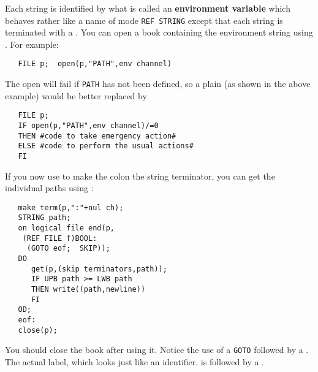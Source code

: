 Each string is identified by what is called an
\textbf{environment variable} which behaves rather like a name of
mode \verb|REF STRING|
except that each string is terminated with a .
You can open a book containing the environment string using
. For example:
\begin{verbatim}
   FILE p;  open(p,"PATH",env channel)
\end{verbatim}
\noindent
The open will fail if \verb|PATH| has not been defined, so
a plain  (as shown in the above example)
would be better replaced by
\begin{verbatim}
   FILE p;
   IF open(p,"PATH",env channel)/=0
   THEN #code to take emergency action#
   ELSE #code to perform the usual actions#
   FI
\end{verbatim}
\noindent
If you now use  to make the
colon \ixtt{:} the string terminator, you can get the
individual paths using :
\begin{verbatim}
   make term(p,":"+nul ch);
   STRING path;
   on logical file end(p,
    (REF FILE f)BOOL:
     (GOTO eof;  SKIP));
   DO
      get(p,(skip terminators,path));
      IF UPB path >= LWB path
      THEN write((path,newline))
      FI
   OD;
   eof:
   close(p);
\end{verbatim}
\noindent
You should close the book after using it. Notice the use of a
\verb|GOTO| followed by a .  The actual label, which looks
just like an identifier. is followed by a .

